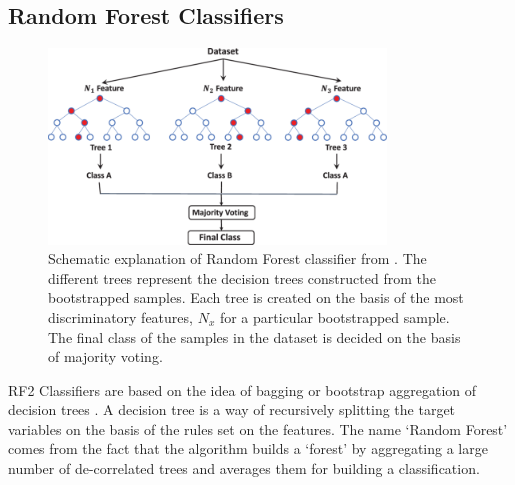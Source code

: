 \documentclass[msthesis.tex]{subfiles}
\begin{document}
\subsection{Random Forest Classifiers}
\begin{figure}
    \centering
    \includegraphics[width=0.8\textwidth]{images/Random_forest.png}
    \caption{Schematic explanation of Random Forest classifier from \cite{TAHMASEBI2020103619}. The different trees represent the decision trees constructed from the bootstrapped samples. Each tree is created on the basis of the most discriminatory features, $N_x$ for a particular bootstrapped sample. The final class of the samples in the dataset is decided on the basis of majority voting.}
    \label{fig:random_forests}
\end{figure}
\gls{RF2} Classifiers are based on the idea of bagging or bootstrap aggregation of decision trees \citep{hastie2009elements}. A decision tree is a way of recursively splitting the target variables on the basis of the rules set on the features. The name `Random Forest' comes from the fact that the algorithm builds a `forest' by aggregating a large number of de-correlated trees and averages them for building a classification. 
\end{document}

